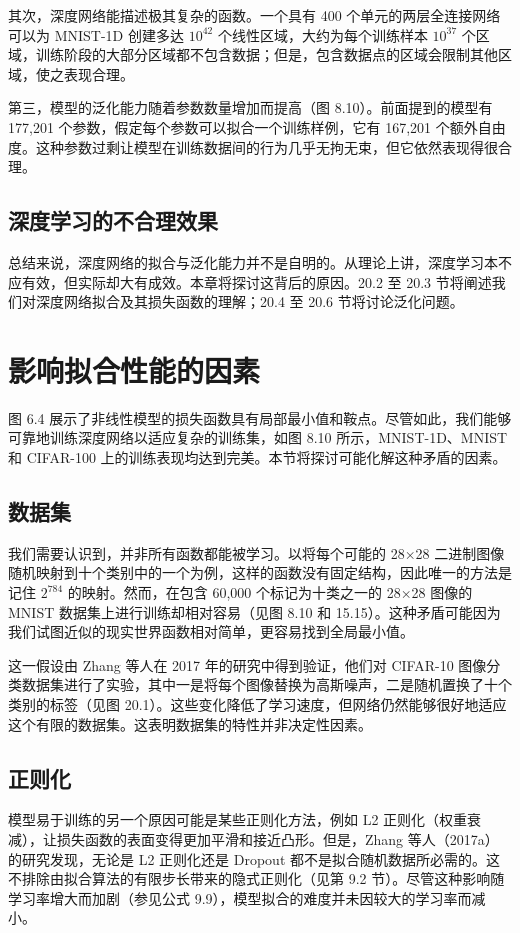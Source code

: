 其次，深度网络能描述极其复杂的函数。一个具有 400 个单元的两层全连接网络可以为 MNIST-1D 创建多达 \(10^42\) 个线性区域，大约为每个训练样本 \(10^37\) 个区域，训练阶段的大部分区域都不包含数据；但是，包含数据点的区域会限制其他区域，使之表现合理。

第三，模型的泛化能力随着参数数量增加而提高（图 8.10）。前面提到的模型有 177,201 个参数，假定每个参数可以拟合一个训练样例，它有 167,201 个额外自由度。这种参数过剩让模型在训练数据间的行为几乎无拘无束，但它依然表现得很合理。

\subsection{深度学习的不合理效果}
总结来说，深度网络的拟合与泛化能力并不是自明的。从理论上讲，深度学习本不应有效，但实际却大有成效。本章将探讨这背后的原因。20.2 至 20.3 节将阐述我们对深度网络拟合及其损失函数的理解；20.4 至 20.6 节将讨论泛化问题。

\section{影响拟合性能的因素}
图 6.4 展示了非线性模型的损失函数具有局部最小值和鞍点。尽管如此，我们能够可靠地训练深度网络以适应复杂的训练集，如图 8.10 所示，MNIST-1D、MNIST 和 CIFAR-100 上的训练表现均达到完美。本节将探讨可能化解这种矛盾的因素。

\subsection{数据集}
我们需要认识到，并非所有函数都能被学习。以将每个可能的 28×28 二进制图像随机映射到十个类别中的一个为例，这样的函数没有固定结构，因此唯一的方法是记住 \(2^784\) 的映射。然而，在包含 60,000 个标记为十类之一的 28×28 图像的 MNIST 数据集上进行训练却相对容易（见图 8.10 和 15.15）。这种矛盾可能因为我们试图近似的现实世界函数相对简单，更容易找到全局最小值。

这一假设由 Zhang 等人在 2017 年的研究中得到验证，他们对 CIFAR-10 图像分类数据集进行了实验，其中一是将每个图像替换为高斯噪声，二是随机置换了十个类别的标签（见图 20.1）。这些变化降低了学习速度，但网络仍然能够很好地适应这个有限的数据集。这表明数据集的特性并非决定性因素。

\subsection{正则化}
模型易于训练的另一个原因可能是某些正则化方法，例如 L2 正则化（权重衰减），让损失函数的表面变得更加平滑和接近凸形。但是，Zhang 等人（2017a）的研究发现，无论是 L2 正则化还是 Dropout 都不是拟合随机数据所必需的。这不排除由拟合算法的有限步长带来的隐式正则化（见第 9.2 节）。尽管这种影响随学习率增大而加剧（参见公式 9.9），模型拟合的难度并未因较大的学习率而减小。

